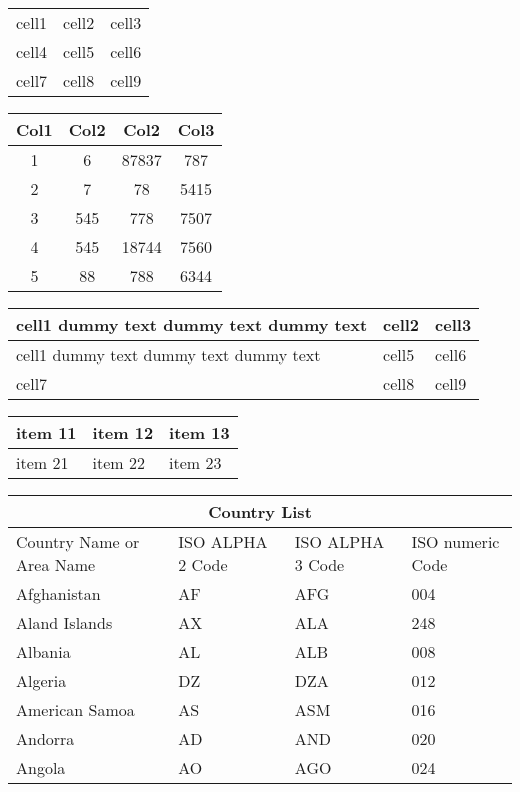 \documentclass[a4paper, 12pt]{article}
\begin{document}
	\begin{center}
		\begin{tabular}{ c c c }
			cell1 & cell2 & cell3 \\ 
			cell4 & cell5 & cell6 \\  
			cell7 & cell8 & cell9    
		\end{tabular}
		
		\clearpage
		
		\begin{tabular}{||c c c c||} 
			\hline
			Col1 & Col2 & Col2 & Col3 \\ [0.5ex] 
			\hline\hline
			1 & 6 & 87837 & 787 \\ 
			\hline
			2 & 7 & 78 & 5415 \\
			\hline
			3 & 545 & 778 & 7507 \\
			\hline
			4 & 545 & 18744 & 7560 \\
			\hline
			5 & 88 & 788 & 6344 \\ [1ex] 
			\hline
		\end{tabular}
	
		\clearpage
		
		\begin{tabular}{ | m{5em} | m{1cm}| m{1cm} | } 
			\hline
			cell1 dummy text dummy text dummy text& cell2 & cell3 \\ 
			\hline
			cell1 dummy text dummy text dummy text & cell5 & cell6 \\ 
			\hline
			cell7 & cell8 & cell9 \\ 
			\hline
		\end{tabular}
	
		\clearpage
		
		\begin{tabularx}{0.8\textwidth} { 
				| >{\raggedright\arraybackslash}X 
				| >{\centering\arraybackslash}X 
				| >{\raggedleft\arraybackslash}X | }
			\hline
			item 11 & item 12 & item 13 \\
			\hline
			item 21  & item 22  & item 23  \\
			\hline
		\end{tabularx}
	
		\clearpage
		
		\begin{tabular}{ |p{3cm}||p{3cm}|p{3cm}|p{3cm}|  }
			\hline
			\multicolumn{4}{|c|}{Country List} \\
			\hline
			Country Name or Area Name& ISO ALPHA 2 Code &ISO ALPHA 3 Code&ISO numeric Code\\
			\hline
			Afghanistan   & AF    &AFG&   004\\
			Aland Islands&   AX  & ALA   &248\\
			Albania &AL & ALB&  008\\
			Algeria    &DZ & DZA&  012\\
			American Samoa&   AS  & ASM&016\\
			Andorra& AD  & AND   &020\\
			Angola& AO  & AGO&024\\
			\hline
		\end{tabular}
	

\end{center}
\end{document}
